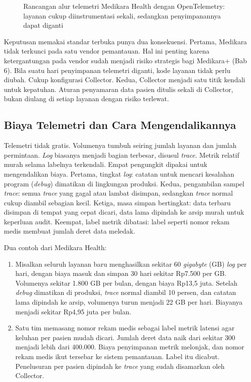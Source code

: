 \begin{figure}[!htb]
  \centering
  
  \caption{Rancangan alur telemetri Medikara Health dengan OpenTelemetry: layanan cukup
           diinstrumentasi sekali, sedangkan penyimpanannya dapat diganti}
  \label{fig:ch11-alur-opentelemetry}
\end{figure}

Keputusan memakai standar terbuka punya dua konsekuensi. Pertama, Medikara tidak terkunci pada
satu vendor pemantauan. Hal ini penting karena ketergantungan pada vendor sudah menjadi risiko
strategis bagi Medikara+ (Bab 6). Bila suatu hari penyimpanan telemetri diganti, kode layanan tidak
perlu diubah. Cukup konfigurasi Collector. Kedua, Collector menjadi satu titik kendali untuk
kepatuhan. Aturan penyamaran data pasien ditulis sekali di Collector, bukan diulang di setiap
layanan dengan risiko terlewat.

\subsection{Biaya Telemetri dan Cara Mengendalikannya}

Telemetri tidak gratis. Volumenya tumbuh seiring jumlah layanan dan jumlah permintaan.
\textit{Log} biasanya menjadi bagian terbesar, disusul \textit{trace}. Metrik relatif murah selama
labelnya terkendali. Empat pengungkit dipakai untuk mengendalikan biaya. Pertama, tingkat
\textit{log}: catatan untuk mencari kesalahan program (\textit{debug}) dimatikan di lingkungan
produksi. Kedua, pengambilan sampel \textit{trace}: semua \textit{trace} yang gagal atau lambat
disimpan, sedangkan \textit{trace} normal cukup diambil sebagian kecil. Ketiga, masa simpan
bertingkat: data terbaru disimpan di tempat yang cepat dicari, data lama dipindah ke arsip murah
untuk keperluan audit. Keempat, label metrik dibatasi: label seperti nomor rekam medis membuat
jumlah deret data meledak.

Dua contoh dari Medikara Health:
\begin{enumerate}
  \item Misalkan seluruh layanan baru menghasilkan sekitar 60 \textit{gigabyte} (GB) \textit{log}
        per hari, dengan biaya masuk dan simpan 30 hari sekitar Rp7.500 per GB. Volumenya sekitar
        1.800 GB per bulan, dengan biaya Rp13,5 juta. Setelah \textit{debug} dimatikan di
        produksi, \textit{trace} normal diambil 10 persen, dan catatan lama dipindah ke arsip,
        volumenya turun menjadi 22 GB per hari. Biayanya menjadi sekitar Rp4,95 juta per bulan.
  \item Satu tim memasang nomor rekam medis sebagai label metrik latensi agar keluhan per pasien
        mudah dicari. Jumlah deret data naik dari sekitar 300 menjadi lebih dari 400.000.
        Biaya penyimpanan metrik melonjak, dan nomor rekam medis ikut tersebar ke sistem
        pemantauan. Label itu dicabut. Penelusuran per pasien dipindah ke \textit{trace} yang
        sudah disamarkan oleh Collector.
\end{enumerate}

